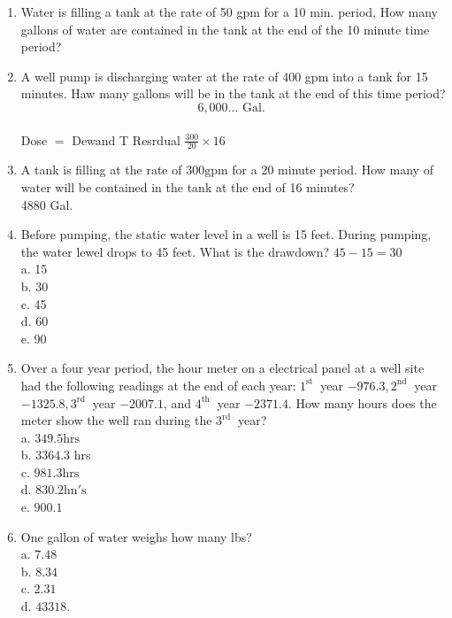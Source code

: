 \begin{enumerate}
\item Water is filling a tank at the rate of 50 gpm for a 10 min. period, How many gallons of water are contained in the tank at the end of the 10 minute time period?\\

\item A well pump is discharging water at the rate of 400 gpm into a tank for 15 minutes. Haw many gallons will be in the tank at the end of this time period?\\
$$6,000 \ldots \text { Gal. }$$\\
Dose $=$ Dewand T Resrdual $\frac{300}{20} \times 16$\\

\item A tank is filling at the rate of $300 \mathrm{gpm}$ for a 20 minute period. How many of water will be contained in the tank at the end of 16 minutes?\\
4880 Gal.\\

\item Before pumping, the static water level in a well is 15 feet. During pumping, the water lewel drops to 45 feet. What is the drawdown? $45-15=30$\\
a. 15\\
b. 30\\
c. 45\\
d. 60\\
e. 90\\

\item Over a four year period, the hour meter on a electrical panel at a well site had the following readings at the end of each year: $1^{\text {st }}$ year $-976.3,2^{\text {nd }}$ year $-1325.8,3^{\text {rd }}$ year $-2007.1$, and $4^{\text {th }}$ year $-2371.4$. How many hours does the meter show the well ran during the $3^{\text {rd }}$ year?\\
a. $349.5 \mathrm{hrs}$\\
b. $3364.3$ hrs\\
c. $981.3 \mathrm{hrs}$\\
d.  $830.2 \mathrm{hn \prime s}$\\
e. $900.1$\\

\item One gallon of water weighs how many lbs?\\
a. $7.48$\\
b. $8.34$\\
c. $2.31$\\
d. $433 18$.


\end{enumerate}
